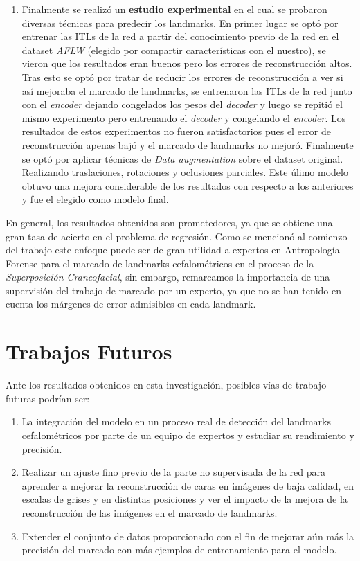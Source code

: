 \begin{enumerate}
    \item Finalmente se realizó un \textbf{estudio experimental} en el cual se probaron diversas técnicas para predecir los landmarks. En primer lugar se optó por entrenar las ITLs de la red a partir del conocimiento previo de la red en el dataset \textit{AFLW} (elegido por compartir características con el nuestro), se vieron que los resultados eran buenos pero los errores de reconstrucción altos. Tras esto se optó por tratar de reducir los errores de reconstrucción a ver si así mejoraba el marcado de landmarks, se entrenaron las ITLs de la red junto con el \textit{encoder} dejando congelados los pesos del \textit{decoder} y luego se repitió el mismo experimento pero entrenando el \textit{decoder} y congelando el \textit{encoder}. Los resultados de estos experimentos no fueron satisfactorios pues el error de reconstrucción apenas bajó y el marcado de landmarks no mejoró. Finalmente se optó por aplicar técnicas de \textit{Data augmentation} sobre el dataset original. Realizando traslaciones, rotaciones y oclusiones parciales. Este úlimo modelo obtuvo una mejora considerable de los resultados con respecto a los anteriores y fue el elegido como modelo final.
\end{enumerate}

\medskip

\noindent En general, los resultados obtenidos son prometedores, ya que se obtiene una gran tasa de acierto en el problema de regresión. Como se mencionó al comienzo del trabajo este enfoque puede ser de gran utilidad a expertos en Antropología Forense para el marcado de landmarks cefalométricos en el proceso de la \textit{Superposición Craneofacial}, sin embargo, remarcamos la importancia de una supervisión del trabajo de marcado por un experto, ya que no se han tenido en cuenta los márgenes de error admisibles en cada landmark.

\section{Trabajos Futuros}

\noindent Ante los resultados obtenidos en esta investigación, posibles vías de trabajo futuras podrían ser:

\begin{enumerate}
    \item La integración del modelo en un proceso real de detección del landmarks cefalométricos por parte de un equipo de expertos y estudiar su rendimiento y precisión.
    \item Realizar un ajuste fino previo de la parte no supervisada de la red para aprender a mejorar la reconstrucción de caras en imágenes de baja calidad, en escalas de grises y en distintas posiciones y ver el impacto de la mejora de la reconstrucción de las imágenes en el marcado de landmarks.
    \item Extender el conjunto de datos proporcionado con el fin de mejorar aún más la precisión del marcado con más ejemplos de entrenamiento para el modelo.
\end{enumerate}


